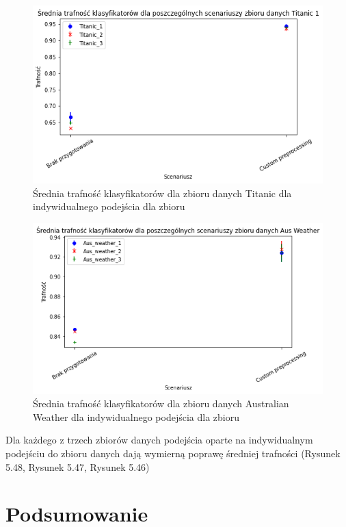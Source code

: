 \documentclass{book}
\begin{document}
\begin{figure}[H]
    \centerline{\includegraphics[scale=0.8]{Titanic_Avg_Custom}}
    \centering
    \caption{Średnia trafność klasyfikatorów dla zbioru danych Titanic 
    dla indywidualnego podejścia dla zbioru}
    \end{figure}

\begin{figure}[H]
    \centerline{\includegraphics[scale=0.8]{Aus_Weather_Avg_Custom}}
    \centering
    \caption{Średnia trafność klasyfikatorów dla zbioru danych Australian Weather 
    dla indywidualnego podejścia dla zbioru}
    \end{figure}

    Dla każdego z trzech zbiorów danych podejścia 
    oparte na indywidualnym podejściu do zbioru 
    danych dają wymierną poprawę średniej trafności 
    (Rysunek 5.48, Rysunek 5.47, Rysunek 5.46)


\chapter{Podsumowanie}
\end{document}
